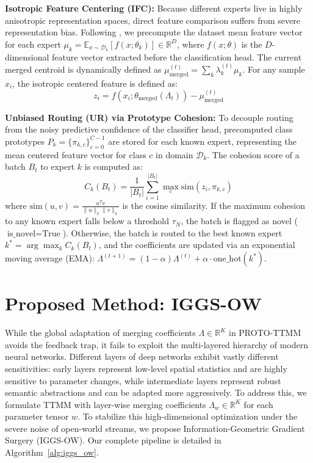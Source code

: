 \documentclass{article}
\theoremstyle{plain}
\theoremstyle{definition}
\theoremstyle{remark}
\begin{document}
\textbf{Isotropic Feature Centering (IFC):} Because different experts live in highly anisotropic representation spaces, direct feature comparison suffers from severe representation bias. Following \cite{authors26b}, we precompute the dataset mean feature vector for each expert $\mu_k = \mathbb{E}_{x \sim \mathcal{D}_k} [f(x; \theta_k)] \in \mathbb{R}^D$, where $f(x; \theta)$ is the $D$-dimensional feature vector extracted before the classification head. The current merged centroid is dynamically defined as $\mu^{(t)}_{\text{merged}} = \sum_k \lambda_k^{(t)} \mu_k$. For any sample $x_i$, the isotropic centered feature is defined as:
\begin{equation}
    z_i = f(x_i; \theta_{\text{merged}}(\Lambda_t)) - \mu^{(t)}_{\text{merged}}
\end{equation}

\textbf{Unbiased Routing (UR) via Prototype Cohesion:} To decouple routing from the noisy predictive confidence of the classifier head, precomputed class prototypes $P_k = \{\pi_{k, c}\}_{c=0}^{C-1}$ are stored for each known expert, representing the mean centered feature vector for class $c$ in domain $\mathcal{D}_k$. The cohesion score of a batch $B_t$ to expert $k$ is computed as:
\begin{equation}
    C_k(B_t) = \frac{1}{|B_t|} \sum_{i=1}^{|B_t|} \max_c \text{sim}(z_i, \pi_{k,c})
\end{equation}
where $\text{sim}(u, v) = \frac{u^T v}{\|u\|_2 \|v\|_2}$ is the cosine similarity. If the maximum cohesion to any known expert falls below a threshold $\tau_N$, the batch is flagged as novel ($\text{is\_novel} = \text{True}$). Otherwise, the batch is routed to the best known expert $k^* = \arg\max_k C_k(B_t)$, and the coefficients are updated via an exponential moving average (EMA): $\Lambda^{(t+1)} = (1-\alpha)\Lambda^{(t)} + \alpha \cdot \text{one\_hot}(k^*)$.

\section{Proposed Method: IGGS-OW}
\label{sec:method}
While the global adaptation of merging coefficients $\Lambda \in \mathbb{R}^K$ in PROTO-TTMM avoids the feedback trap, it fails to exploit the multi-layered hierarchy of modern neural networks. Different layers of deep networks exhibit vastly different sensitivities: early layers represent low-level spatial statistics and are highly sensitive to parameter changes, while intermediate layers represent robust semantic abstractions and can be adapted more aggressively. To address this, we formulate TTMM with layer-wise merging coefficients $\Lambda_w \in \mathbb{R}^K$ for each parameter tensor $w$. To stabilize this high-dimensional optimization under the severe noise of open-world streams, we propose Information-Geometric Gradient Surgery (IGGS-OW). Our complete pipeline is detailed in Algorithm~\ref{alg:iggs_ow}.
\end{document}
